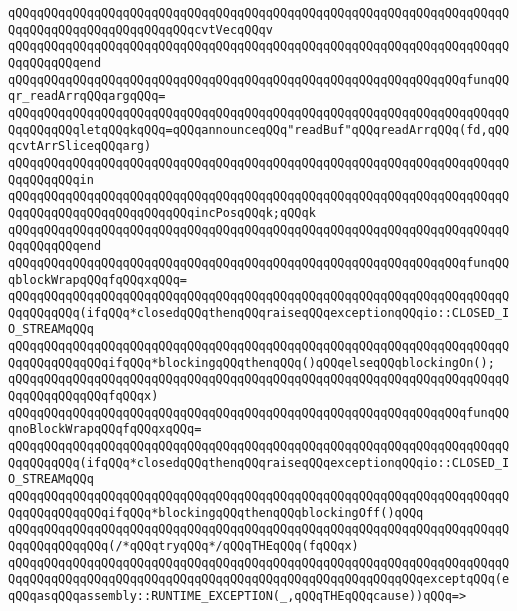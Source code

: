 \verb|qQQqqQQqqQQqqQQqqQQqqQQqqQQqqQQqqQQqqQQqqQQqqQQqqQQqqQQqqQQqqQQqqQQqqQQqqQQqqQQqqQQqqQQqqQQqqQQqcvtVecqQQqv|\newline
\verb|qQQqqQQqqQQqqQQqqQQqqQQqqQQqqQQqqQQqqQQqqQQqqQQqqQQqqQQqqQQqqQQqqQQqqQQqqQQqqQQqend|\newline
\verb|qQQqqQQqqQQqqQQqqQQqqQQqqQQqqQQqqQQqqQQqqQQqqQQqqQQqqQQqqQQqqQQqfunqQQqr_readArrqQQqargqQQq=|\newline
\verb|qQQqqQQqqQQqqQQqqQQqqQQqqQQqqQQqqQQqqQQqqQQqqQQqqQQqqQQqqQQqqQQqqQQqqQQqqQQqqQQqletqQQqkqQQq=qQQqannounceqQQq"readBuf"qQQqreadArrqQQq(fd,qQQqcvtArrSliceqQQqarg)|\newline
\verb|qQQqqQQqqQQqqQQqqQQqqQQqqQQqqQQqqQQqqQQqqQQqqQQqqQQqqQQqqQQqqQQqqQQqqQQqqQQqqQQqin|\newline
\verb|qQQqqQQqqQQqqQQqqQQqqQQqqQQqqQQqqQQqqQQqqQQqqQQqqQQqqQQqqQQqqQQqqQQqqQQqqQQqqQQqqQQqqQQqqQQqqQQqincPosqQQqk;qQQqk|\newline
\verb|qQQqqQQqqQQqqQQqqQQqqQQqqQQqqQQqqQQqqQQqqQQqqQQqqQQqqQQqqQQqqQQqqQQqqQQqqQQqqQQqend|\newline
\verb|qQQqqQQqqQQqqQQqqQQqqQQqqQQqqQQqqQQqqQQqqQQqqQQqqQQqqQQqqQQqqQQqfunqQQqblockWrapqQQqfqQQqxqQQq=|\newline
\verb|qQQqqQQqqQQqqQQqqQQqqQQqqQQqqQQqqQQqqQQqqQQqqQQqqQQqqQQqqQQqqQQqqQQqqQQqqQQqqQQq(ifqQQq*closedqQQqthenqQQqraiseqQQqexceptionqQQqio::CLOSED_IO_STREAMqQQq|\newline
\verb|qQQqqQQqqQQqqQQqqQQqqQQqqQQqqQQqqQQqqQQqqQQqqQQqqQQqqQQqqQQqqQQqqQQqqQQqqQQqqQQqqQQqifqQQq*blockingqQQqthenqQQq()qQQqelseqQQqblockingOn();|\newline
\verb|qQQqqQQqqQQqqQQqqQQqqQQqqQQqqQQqqQQqqQQqqQQqqQQqqQQqqQQqqQQqqQQqqQQqqQQqqQQqqQQqqQQqfqQQqx)|\newline
\verb|qQQqqQQqqQQqqQQqqQQqqQQqqQQqqQQqqQQqqQQqqQQqqQQqqQQqqQQqqQQqqQQqfunqQQqnoBlockWrapqQQqfqQQqxqQQq=|\newline
\verb|qQQqqQQqqQQqqQQqqQQqqQQqqQQqqQQqqQQqqQQqqQQqqQQqqQQqqQQqqQQqqQQqqQQqqQQqqQQqqQQq(ifqQQq*closedqQQqthenqQQqraiseqQQqexceptionqQQqio::CLOSED_IO_STREAMqQQq|\newline
\verb|qQQqqQQqqQQqqQQqqQQqqQQqqQQqqQQqqQQqqQQqqQQqqQQqqQQqqQQqqQQqqQQqqQQqqQQqqQQqqQQqqQQqifqQQq*blockingqQQqthenqQQqblockingOff()qQQq|\newline
\verb|qQQqqQQqqQQqqQQqqQQqqQQqqQQqqQQqqQQqqQQqqQQqqQQqqQQqqQQqqQQqqQQqqQQqqQQqqQQqqQQqqQQq(/*qQQqtryqQQq*/qQQqTHEqQQq(fqQQqx)|\newline
\verb|qQQqqQQqqQQqqQQqqQQqqQQqqQQqqQQqqQQqqQQqqQQqqQQqqQQqqQQqqQQqqQQqqQQqqQQqqQQqqQQqqQQqqQQqqQQqqQQqqQQqqQQqqQQqqQQqqQQqqQQqqQQqqQQqexceptqQQq(eqQQqasqQQqassembly::RUNTIME_EXCEPTION(_,qQQqTHEqQQqcause))qQQq=>|\newline
